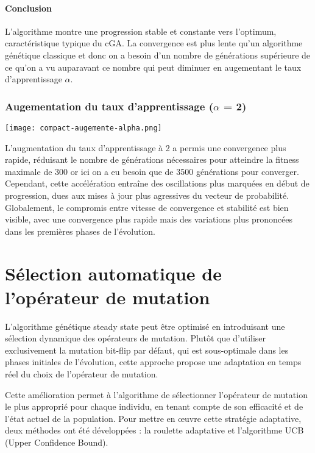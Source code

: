 \documentclass{article}
\begin{document}
\paragraph{Conclusion} L'algorithme montre une progression stable et constante vers l'optimum, caractéristique typique du cGA. La convergence est plus lente qu'un algorithme génétique classique et donc on a besoin d'un nombre de générations supérieure de ce qu'on a vu auparavant ce nombre qui peut diminuer en augementant le taux d'apprentissage $\alpha$.

\subsubsection{Augementation du taux d'apprentissage ($\alpha$ = 2)}

\texttt{[image: compact-augemente-alpha.png]}

L'augmentation du taux d'apprentissage à 2 a permis une convergence plus rapide, réduisant le nombre de générations nécessaires pour atteindre la fitness maximale de 300 or ici on a eu besoin que de 3500 générations pour converger. Cependant, cette accélération entraîne des oscillations plus marquées en début de progression, dues aux mises à jour plus agressives du vecteur de probabilité. Globalement, le compromis entre vitesse de convergence et stabilité est bien visible, avec une convergence plus rapide mais des variations plus prononcées dans les premières phases de l'évolution.

\section{Sélection automatique de l’opérateur de mutation}

L'algorithme génétique steady state peut être optimisé en introduisant une sélection dynamique des opérateurs de mutation. Plutôt que d'utiliser exclusivement la mutation bit-flip par défaut, qui est sous-optimale dans les phases initiales de l'évolution, cette approche propose une adaptation en temps réel du choix de l'opérateur de mutation.

Cette amélioration permet à l'algorithme de sélectionner l'opérateur de mutation le plus approprié pour chaque individu, en tenant compte de son efficacité et de l'état actuel de la population. Pour mettre en œuvre cette stratégie adaptative, deux méthodes ont été développées : la roulette adaptative et l'algorithme UCB (Upper Confidence Bound).
\end{document}
